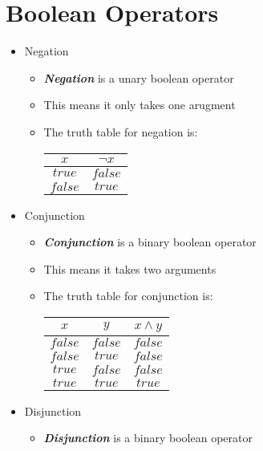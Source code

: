 \documentclass{article}
\begin{document}
\section{Boolean Operators}
\begin{itemize}
  \item{Negation}
  \begin{itemize}
    \item{\textbf{\textit{Negation}} is a unary boolean operator}
    \item{This means it only takes one arugment}
    \item{The truth table for negation is:} \\
    \begin{center}
      \begin{tabular}{ |c|c| }
        \hline
        $x$ & $\neg{x}$ \\
        \hline
        $true$ & $false$ \\
        $false$ & $true$ \\
        \hline
      \end{tabular}
    \end{center}
  \end{itemize}
  \pagebreak
  \item{Conjunction}
  \begin{itemize}
    \item{\textbf{\textit{Conjunction}} is a binary boolean operator}
    \item{This means it takes two arguments}
    \item{The truth table for conjunction is:} \\
    \begin{center}
      \begin{tabular}{ |c|c|c| }
        \hline
        $x$ & $y$ & $x \land y$ \\
        \hline
        $false$ & $false$ & $false$ \\
        $false$ & $true$ & $false$ \\
        $true$ & $false$ & $false$ \\
        $true$ & $true$ & $true$ \\
        \hline
      \end{tabular}
    \end{center}
  \end{itemize}
  \item{Disjunction}
  \begin{itemize}
    \item{\textbf{\textit{Disjunction}} is a binary boolean operator}

\end{itemize}
\end{itemize}
\end{document}
